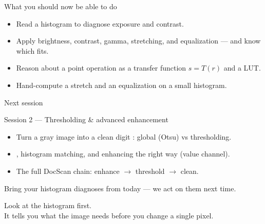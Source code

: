 \documentclass[10pt,aspectratio=169]{beamer}
\begin{document}
\begin{frame}{What you should now be able to do}
  \begin{itemize}
    \item Read a histogram to diagnose exposure and contrast.
    \item Apply brightness, contrast, gamma, stretching, and equalization — and know which fits.
    \item Reason about a point operation as a transfer function $s=T(r)$ and a LUT.
    \item Hand-compute a stretch and an equalization on a small histogram.
  \end{itemize}
\end{frame}

\begin{frame}{Next session}
  \begin{alertblock}{Session 2 — Thresholding \& advanced enhancement}
    \begin{itemize}
      \item Turn a gray image into a clean digit : global (Otsu) vs  thresholding.
      \item {}, histogram matching, and enhancing  the right way (value channel).
      \item The full DocScan chain: enhance $\rightarrow$ threshold $\rightarrow$ clean.
    \end{itemize}
  \end{alertblock}
  \begin{center}\footnotesize Bring your histogram diagnoses from today — we act on them next time.\end{center}
\end{frame}

\begin{frame}[standout]
  Look at the histogram first.\\[4pt]
  \normalsize It tells you what the image needs before you change a single pixel.
\end{frame}
\end{document}
